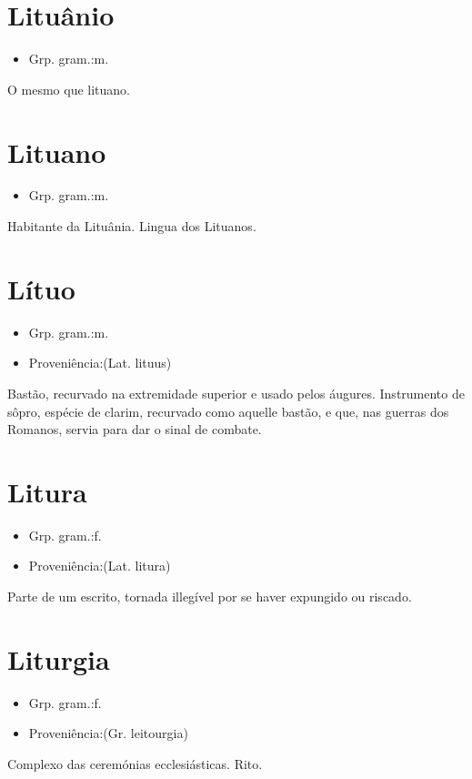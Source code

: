 \section{Lituânio}
\begin{itemize}
\item {Grp. gram.:m.}
\end{itemize}
O mesmo que \textunderscore lituano\textunderscore .
\section{Lituano}
\begin{itemize}
\item {Grp. gram.:m.}
\end{itemize}
Habitante da Lituânia.
Lingua dos Lituanos.
\section{Lítuo}
\begin{itemize}
\item {Grp. gram.:m.}
\end{itemize}
\begin{itemize}
\item {Proveniência:(Lat. \textunderscore lituus\textunderscore )}
\end{itemize}
Bastão, recurvado na extremidade superior e usado pelos áugures.
Instrumento de sôpro, espécie de clarim, recurvado como aquelle bastão, e que, nas guerras dos Romanos, servia para dar o sinal de combate.
\section{Litura}
\begin{itemize}
\item {Grp. gram.:f.}
\end{itemize}
\begin{itemize}
\item {Proveniência:(Lat. \textunderscore litura\textunderscore )}
\end{itemize}
Parte de um escrito, tornada illegível por se haver expungido ou riscado.
\section{Liturgia}
\begin{itemize}
\item {Grp. gram.:f.}
\end{itemize}
\begin{itemize}
\item {Proveniência:(Gr. \textunderscore leitourgia\textunderscore )}
\end{itemize}
Complexo das ceremónias ecclesiásticas.
Rito.
